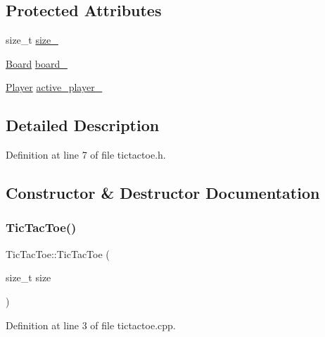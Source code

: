 \subsection*{Protected Attributes}
\begin{DoxyCompactItemize}
\item 
size\+\_\+t \hyperlink{class_tic_tac_toe_afc64aed11c9b53b699c61a8cc3b58dc2}{size\+\_\+}
\item 
\hyperlink{common__defs_8h_a0dc5e1c0d1c3d4b1e210c805de5ca27b}{Board} \hyperlink{class_tic_tac_toe_a577cac99116dca16cfa05890152c2d55}{board\+\_\+}
\item 
\hyperlink{common__defs_8h_a9c8780378078e51e7c9041cbac392db9}{Player} \hyperlink{class_tic_tac_toe_a5acba985df8b3d158783a5f4f3521f2e}{active\+\_\+player\+\_\+}
\end{DoxyCompactItemize}


\subsection{Detailed Description}


Definition at line 7 of file tictactoe.\+h.



\subsection{Constructor \& Destructor Documentation}
\mbox{\label{class_tic_tac_toe_a27555f19d0f8041ef8ce9a268ec0554c}} 
\subsubsection{\texorpdfstring{Tic\+Tac\+Toe()}{TicTacToe()}\hspace{0.1cm}{\footnotesize\ttfamily [1/2]}}
{\footnotesize\ttfamily Tic\+Tac\+Toe\+::\+Tic\+Tac\+Toe (\begin{DoxyParamCaption}\item[{size\+\_\+t}]{size }\end{DoxyParamCaption})}



Definition at line 3 of file tictactoe.\+cpp.

\mbox{\label{class_tic_tac_toe_a85910bb5d348929c9fef9f0b23813a60}} 
